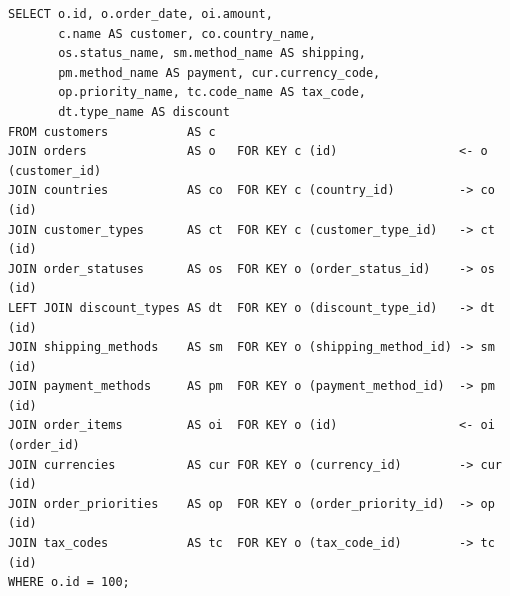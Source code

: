 \documentclass[12pt]{article}
\newcommand{\FanoutCheckHeight}[3]{%
  \ifdim\dimexpr\ht#1+\dp#1\relax>#2\relax
    \PackageError{fanout-layout}{#3 exceeds its vertical allocation}%
      {Adjust the terminal line spacing or the box position.}%
  \fi
}
\begin{document}
\newsavebox{\canonicalStageFour}
\begin{lrbox}{\canonicalStageFour}\begin{minipage}{344mm}
\begin{NoHyper}
\begin{lstlisting}[style=complex-sql]
SELECT o.id, o.order_date, oi.amount,
       c.name AS customer, co.country_name,
       os.status_name, sm.method_name AS shipping,
       pm.method_name AS payment, cur.currency_code,
       op.priority_name, tc.code_name AS tax_code,
       dt.type_name AS discount
FROM customers           AS c
JOIN orders              AS o   FOR KEY c (id)                 <- o (customer_id)
JOIN countries           AS co  FOR KEY c (country_id)         -> co (id)
JOIN customer_types      AS ct  FOR KEY c (customer_type_id)   -> ct (id)
JOIN order_statuses      AS os  FOR KEY o (order_status_id)    -> os (id)
LEFT JOIN discount_types AS dt  FOR KEY o (discount_type_id)   -> dt (id)
JOIN shipping_methods    AS sm  FOR KEY o (shipping_method_id) -> sm (id)
JOIN payment_methods     AS pm  FOR KEY o (payment_method_id)  -> pm (id)
JOIN order_items         AS oi  FOR KEY o (id)                 <- oi (order_id)
JOIN currencies          AS cur FOR KEY o (currency_id)        -> cur (id)
JOIN order_priorities    AS op  FOR KEY o (order_priority_id)  -> op (id)
JOIN tax_codes           AS tc  FOR KEY o (tax_code_id)        -> tc (id)
WHERE o.id = 100;
\end{lstlisting}
\end{NoHyper}
\end{minipage}\end{lrbox}
\FanoutCheckHeight{\canonicalStageFour}{122mm}{Canonical-form state 4}
\end{document}
